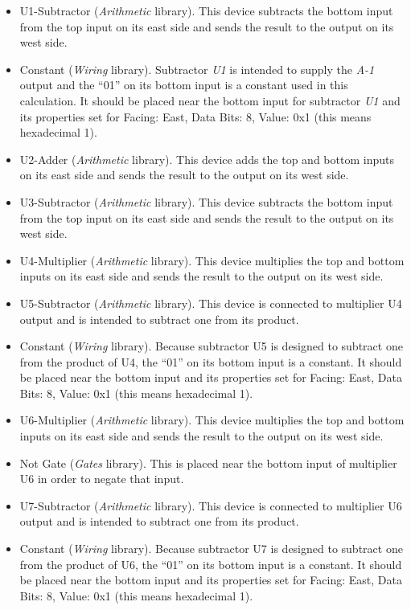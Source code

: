 \begin{itemize}
	\item U1-Subtractor (\textit{Arithmetic} library). This device subtracts the bottom input from the top input on its east side and sends the result to the output on its west side.
	\item Constant (\textit{Wiring} library). Subtractor \textit{U1} is intended to supply the \textit{A-1} output and the ``01'' on its bottom input is a constant used in this calculation. It should be placed near the bottom input for subtractor \textit{U1} and its properties set for Facing: East, Data Bits: 8, Value: 0x1 (this means hexadecimal 1).
	\item U2-Adder (\textit{Arithmetic} library). This device adds the top and bottom inputs on its east side and sends the result to the output on its west side.
	\item U3-Subtractor (\textit{Arithmetic} library). This device subtracts the bottom input from the top input on its east side and sends the result to the output on its west side.
	\item U4-Multiplier (\textit{Arithmetic} library). This device multiplies the top and bottom inputs on its east side and sends the result to the output on its west side.
	\item U5-Subtractor (\textit{Arithmetic} library). This device is connected to multiplier U4 output and is intended to subtract one from its product.
	\item Constant (\textit{Wiring} library). Because subtractor U5 is designed to subtract one from the product of U4, the ``01'' on its bottom input is a constant. It should be placed near the bottom input and its properties set for Facing: East, Data Bits: 8, Value: 0x1 (this means hexadecimal 1).
	\item U6-Multiplier (\textit{Arithmetic} library). This device multiplies the top and bottom inputs on its east side and sends the result to the output on its west side.
	\item Not Gate (\textit{Gates} library). This is placed near the bottom input of multiplier U6 in order to negate that input.
	\item U7-Subtractor (\textit{Arithmetic} library). This device is connected to multiplier U6 output and is intended to subtract one from its product.
	\item Constant (\textit{Wiring} library). Because subtractor U7 is designed to subtract one from the product of U6, the ``01'' on its bottom input is a constant. It should be placed near the bottom input and its properties set for Facing: East, Data Bits: 8, Value: 0x1 (this means hexadecimal 1).	

\end{itemize}
